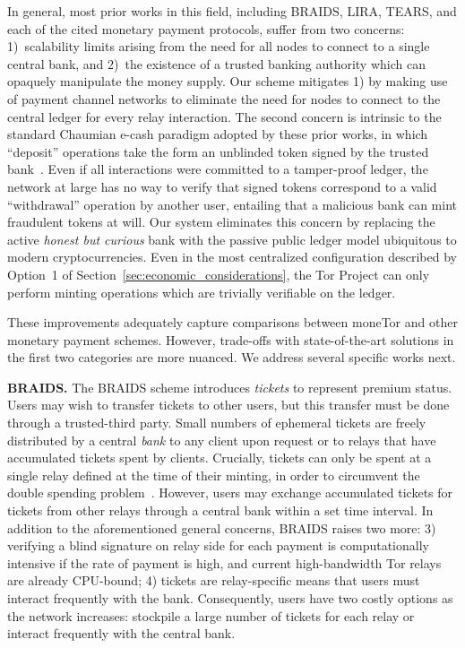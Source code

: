 In general, most prior works in this field, including BRAIDS, LIRA, TEARS, and each of the cited monetary payment protocols, suffer from two concerns: 1)~scalability limits arising from the need for all nodes to connect to a single central bank, and 2)~the existence of a trusted banking authority which can opaquely manipulate the money supply.
Our scheme mitigates 1) by making use of payment channel networks to eliminate the need for nodes to connect to the central ledger for every relay interaction.
The second concern is intrinsic to the standard Chaumian e-cash paradigm adopted by these prior works, in which ``deposit'' operations take the form an unblinded token signed by the trusted bank~\cite{chaum1988untraceable}.
Even if all interactions were committed to a tamper-proof ledger, the network at large has no way to verify that signed tokens correspond to a valid ``withdrawal'' operation by another user, entailing that a malicious bank can mint fraudulent tokens at will.
Our system eliminates this concern by replacing the active \emph{honest but curious} bank with the passive public ledger model ubiquitous to modern cryptocurrencies.
Even in the most centralized configuration described by Option~1 of Section~\ref{sec:economic_considerations}, the Tor Project can only perform minting operations which are trivially verifiable on the ledger.

These improvements adequately capture comparisons between moneTor and other monetary payment schemes.
However, trade-offs with state-of-the-art solutions in the first two categories are more nuanced.
We address several specific works next.

\medskip\noindent\textbf{BRAIDS.}
The BRAIDS scheme introduces \emph{tickets} to represent premium status.
Users may wish to transfer tickets to other users, but this transfer must be done through a trusted-third party.
Small numbers of ephemeral tickets are freely distributed by a central \emph{bank} to any client upon request or to relays that have accumulated tickets spent by clients.
Crucially, tickets can only be spent at a single relay defined at the time of their minting, in order to circumvent the double spending problem~\cite{jansen2010recruiting}.
However, users may exchange accumulated tickets for tickets from other relays through a central bank within a set time interval.
In addition to the aforementioned general concerns, BRAIDS raises two more: 3) verifying a blind signature on relay side for each payment is computationally intensive if the rate of payment is high, and current high-bandwidth Tor relays are already CPU-bound; 4) tickets are relay-specific means that users must interact frequently with the bank.
Consequently, users have two costly options as the network increases: stockpile a large number of tickets for each relay or interact frequently with the central bank.

